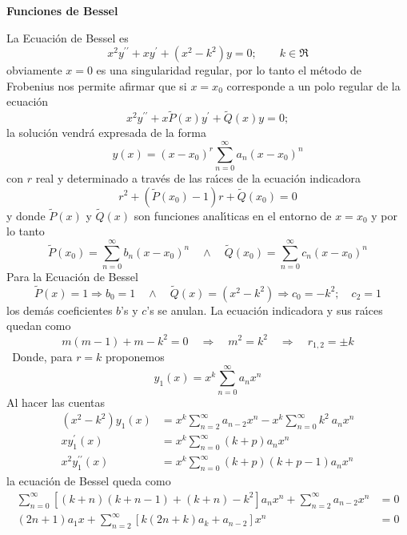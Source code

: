 \documentclass[spanish,notitlepage,letterpaper,12pt]{article}
\begin{document}
\begin{center}
\textbf{Funciones de Bessel}
\end{center}

La Ecuaci\'{o}n de Bessel es
\[
x^{2}y^{\prime\prime}+xy^{\prime}+\left(  x^{2}-k^{2}\right)  y=0;\qquad
k\in\Re
\]
obviamente $x=0$ es una singularidad regular, por lo tanto el m\'{e}todo de
Frobenius nos permite afirmar que si $x=x_{0}$ corresponde a un polo regular
de la ecuaci\'{o}n
\[
x^{2}y^{\prime\prime}+x\tilde{P}\left(  x\right)  y^{\prime}+\tilde{Q}\left(
x\right)  y=0;
\]
la soluci\'{o}n vendr\'{a} expresada de la forma
\[
y(x)=\left(  x-x_{0}\right)  ^{r}\sum_{n=0}^{\infty}a_{n}\left(
x-x_{0}\right)  ^{n}
\]
con $r$ real y determinado a trav\'{e}s de las ra\'{\i}ces de la ecuaci\'{o}n
indicadora
\[
r^{2}+\left(  \tilde{P}(x_{0})-1\right)  r+\tilde{Q}(x_{0})=0
\]
y donde $\tilde{P}\left(  x\right)  $ y $\tilde{Q}\left(  x\right)  $ son
funciones anal\'{\i}ticas en el entorno de $x=x_{0}$ y por lo tanto
\[
\tilde{P}(x_{0})=\sum_{n=0}^{\infty}b_{n}\left(  x-x_{0}\right)  ^{n}%
\quad\wedge\quad\tilde{Q}(x_{0})=\sum_{n=0}^{\infty}c_{n}\left(
x-x_{0}\right)  ^{n}
\]
Para la Ecuaci\'{o}n de Bessel
\[
\tilde{P}\left(  x\right)  =1\Rightarrow b_{0}=1\quad\wedge\quad\tilde
{Q}(x)=\left(  x^{2}-k^{2}\right)  \Rightarrow c_{0}=-k^{2};\quad c_{2}=1
\]
los dem\'{a}s coeficientes $b$'s y $c$'s se anulan. La ecuaci\'{o}n indicadora
y sus ra\'{\i}ces quedan como
\[
m\left(  m-1\right)  +m-k^{2}=0\quad\Rightarrow\quad m^{2}=k^{2}%
\quad\Rightarrow\quad r_{1,2}=\pm k
\]
\textit{\ }Donde, para $r=k$ proponemos
\[
y_{1}(x)=x^{k}\sum_{n=0}^{\infty}a_{n}x^{n}
\]
Al hacer las cuentas
\begin{align*}
\left(  x^{2}-k^{2}\right)  y_{1}(x)  & =x^{k}\sum_{n=2}^{\infty}a_{n-2}%
x^{n}-x^{k}\sum_{n=0}^{\infty}k^{2}\ a_{n}x^{n}\\
xy_{1}^{\prime}(x)  & =x^{k}\sum_{n=0}^{\infty}\left(  k+p\right)  a_{n}%
x^{n}\\
x^{2}y_{1}^{\prime\prime}(x)  & =x^{k}\sum_{n=0}^{\infty}\left(  k+p\right)
\left(  k+p-1\right)  a_{n}x^{n}%
\end{align*}
la ecuaci\'{o}n de Bessel queda como
\begin{align*}
\sum_{n=0}^{\infty}\left[  \left(  k+n\right)  \left(  k+n-1\right)  +\left(
k+n\right)  -k^{2}\right]  a_{n}x^{n}+\sum_{n=2}^{\infty}a_{n-2}x^{n}  & =0\\
\left(  2n+1\right)  a_{1}x+\sum_{n=2}^{\infty}\left[  k\left(  2n+k\right)
a_{k}+a_{n-2}\right]  x^{n}  & =0
\end{align*}
\end{document}
